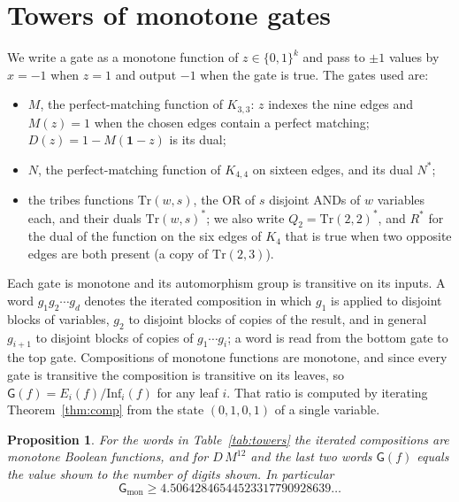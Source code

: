 \documentclass[11pt]{amsart}
\newtheorem{proposition}[theorem]{Proposition}
\theoremstyle{definition}
\theoremstyle{remark}
\newcommand{\Inf}{\mathrm{Inf}}
\newcommand{\G}{\mathsf{G}}
\begin{document}
\section{Towers of monotone gates}\label{sec:towers}

We write a gate as a monotone function of $z\in\{0,1\}^k$ and pass to $\pm1$ values by $x=-1$ when $z=1$ and
output $-1$ when the gate is true. The gates used are:
\begin{itemize}
\item $M$, the perfect-matching function of $K_{3,3}$: $z$ indexes the nine edges and $M(z)=1$ when the chosen edges
contain a perfect matching; $D(z)=1-M(\mathbf 1-z)$ is its dual;
\item $N$, the perfect-matching function of $K_{4,4}$ on sixteen edges, and its dual $N^\ast$;
\item the tribes functions $\mathrm{Tr}(w,s)$, the OR of $s$ disjoint ANDs of $w$ variables each, and their duals
$\mathrm{Tr}(w,s)^\ast$; we also write $Q_2=\mathrm{Tr}(2,2)^\ast$, and $R^\ast$ for the dual of the function on the six edges of $K_4$ that is
true when two opposite edges are both present (a copy of $\mathrm{Tr}(2,3)$).
\end{itemize}
Each gate is monotone and its automorphism group is transitive on its inputs. A word $g_1g_2\cdots g_d$ denotes the
iterated composition in which $g_1$ is applied to disjoint blocks of variables, $g_2$ to disjoint blocks of copies
of the result, and in general $g_{i+1}$ to disjoint blocks of copies of $g_1\cdots g_i$; a word is read from the bottom gate to the top gate. Compositions of monotone functions
are monotone, and since every gate is transitive the composition is transitive on its leaves, so
$\G(f)=E_i(f)/\Inf_i(f)$ for any leaf $i$. That ratio is computed by iterating Theorem~\ref{thm:comp} from the
state $(0,1,0,1)$ of a single variable.

\begin{proposition}\label{prop:towers}
For the words in Table~\ref{tab:towers} the iterated compositions are monotone Boolean functions, and for
$D\,M^{12}$ and the last two words $\G(f)$ equals the value shown to the number of digits shown. In particular
\[
\G_{\mathrm{mon}}\ge 4.50642846544523317790928639\dots
\]
\end{proposition}
\end{document}
